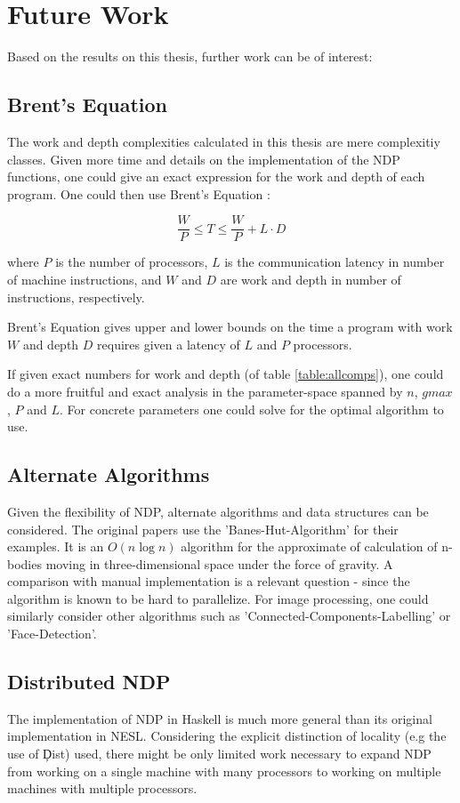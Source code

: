   
\section{Future Work}
  Based on the results on this thesis, further work can be of interest:
  
  \subsection{Brent's Equation}
    The work and depth complexities calculated in this thesis are mere complexitiy classes.
    Given more time and details on the implementation of the NDP functions,
    one could give an exact expression for the work and depth of each program.
    One could then use Brent's Equation \cite{Brent2011}:
    
    $$ \frac{W}{P} \leq T \leq \frac{W}{P} + L \cdot D $$
    
    where $P$ is the number of processors,
    $L$ is the communication latency in number of machine instructions,
    and $W$ and $D$ are work and depth in number of instructions, respectively.
    
    Brent's Equation gives upper and lower bounds on
    the time a program with work $W$ and depth $D$
    requires given a latency of $L$ and $P$ processors.
    
    If given exact numbers for work and depth (of table \ref{table:allcomps}), one could do a
    more fruitful and exact analysis in the parameter-space
    spanned by $n$, $gmax$, $P$ and $L$.
    For concrete parameters one could solve for the optimal
    algorithm to use.
  
  \subsection{Alternate Algorithms}
    Given the flexibility of NDP, alternate algorithms and data structures can be considered.
    The original papers \cite{Harness2008} use the 'Banes-Hut-Algorithm' for
    their examples. It is an $O(n \log n)$ algorithm for the approximate of
    calculation of n-bodies moving in three-dimensional space under the
    force of gravity. A comparison with manual implementation is
    a relevant question - since the algorithm is known
    to be hard to parallelize. For image processing,
    one could similarly consider other algorithms such as
    'Connected-Components-Labelling' or 'Face-Detection'.
    
  \subsection{Distributed NDP}
    The implementation of NDP in Haskell is much more general than its original
    implementation in NESL. Considering the explicit distinction of locality (e.g the use of \c{Dist})
    used, there might be only limited work necessary to expand NDP from working on a single machine
    with many processors to working on multiple machines with multiple processors.

